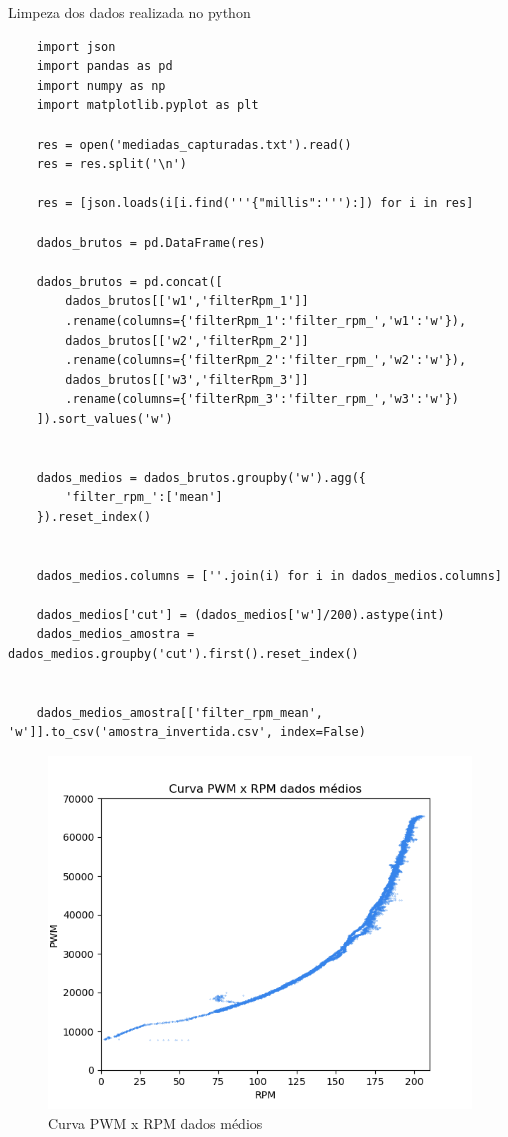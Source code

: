 Limpeza dos dados realizada no python
\begin{lstlisting}
    import json
    import pandas as pd
    import numpy as np
    import matplotlib.pyplot as plt
    
    res = open('mediadas_capturadas.txt').read()
    res = res.split('\n')
    
    res = [json.loads(i[i.find('''{"millis":'''):]) for i in res]
    
    dados_brutos = pd.DataFrame(res)
    
    dados_brutos = pd.concat([
        dados_brutos[['w1','filterRpm_1']]
        .rename(columns={'filterRpm_1':'filter_rpm_','w1':'w'}),
        dados_brutos[['w2','filterRpm_2']]
        .rename(columns={'filterRpm_2':'filter_rpm_','w2':'w'}),
        dados_brutos[['w3','filterRpm_3']]
        .rename(columns={'filterRpm_3':'filter_rpm_','w3':'w'})
    ]).sort_values('w')
    
    
    dados_medios = dados_brutos.groupby('w').agg({
        'filter_rpm_':['mean']
    }).reset_index()
    
    
    dados_medios.columns = [''.join(i) for i in dados_medios.columns]
    
    dados_medios['cut'] = (dados_medios['w']/200).astype(int)
    dados_medios_amostra = dados_medios.groupby('cut').first().reset_index()
    
    
    dados_medios_amostra[['filter_rpm_mean', 'w']].to_csv('amostra_invertida.csv', index=False)

\end{lstlisting}


\begin{figure}[h]
	\centering
	\includegraphics{figures/curva_pwm_x_rpm_dados_medios}
	\caption{Curva PWM x RPM dados médios}
	\label{lof}
\end{figure}




